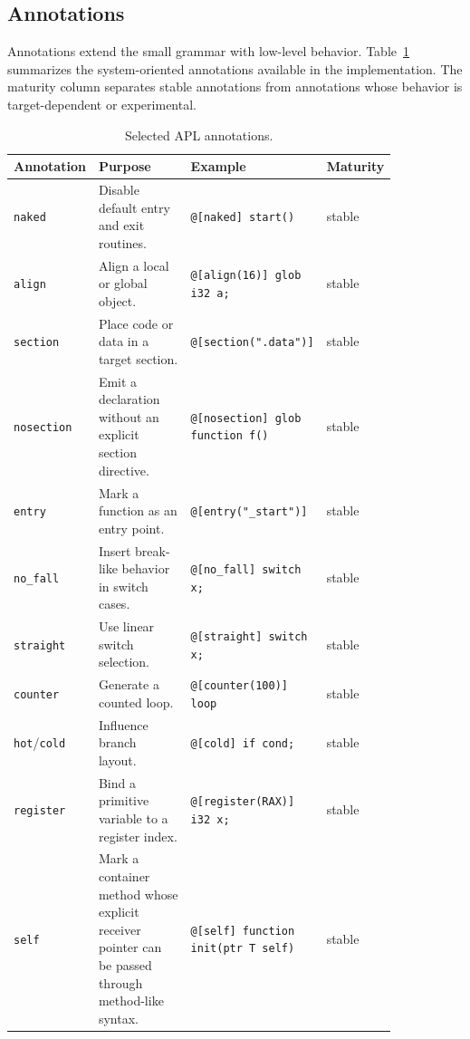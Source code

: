 \documentclass[10pt,twocolumn]{article}
\begin{document}
\subsection{Annotations}

\par Annotations extend the small grammar with low-level behavior. Table~\ref{tab:annotations} summarizes the system-oriented annotations available in the implementation. The maturity column separates stable annotations from annotations whose behavior is target-dependent or experimental.

\begin{table}[t]
\centering
\footnotesize
\caption{Selected APL annotations.}
\label{tab:annotations}
\begin{tabular}{p{0.12\linewidth}p{0.38\linewidth}p{0.22\linewidth}p{0.12\linewidth}}
\toprule
Annotation & Purpose & Example & Maturity \\
\midrule
\texttt{naked}             & Disable default entry and exit routines. & \texttt{@[naked] start()} & stable \\
\texttt{align}             & Align a local or global object. & \texttt{@[align(16)] glob i32 a;} & stable \\
\texttt{section}           & Place code or data in a target section. & \texttt{@[section(".data")]} & stable \\
\texttt{nosection}         & Emit a declaration without an explicit section directive. & \texttt{@[nosection] glob function f()} & stable \\
\texttt{entry}             & Mark a function as an entry point. & \texttt{@[entry("\_start")]} & stable \\
\texttt{no\_fall}          & Insert break-like behavior in switch cases. & \texttt{@[no\_fall] switch x;} & stable \\
\texttt{straight}          & Use linear switch selection. & \texttt{@[straight] switch x;} & stable \\
\texttt{counter}           & Generate a counted loop. & \texttt{@[counter(100)] loop} & stable \\
\texttt{hot}/\texttt{cold} & Influence branch layout. & \texttt{@[cold] if cond;} & stable \\
\texttt{register}          & Bind a primitive variable to a register index. & \texttt{@[register(RAX)] i32 x;} & stable \\
\texttt{self}              & Mark a container method whose explicit receiver pointer can be passed through method-like syntax. & \texttt{@[self] function init(ptr T self)} & stable \\

\end{tabular}
\end{table}
\end{document}
